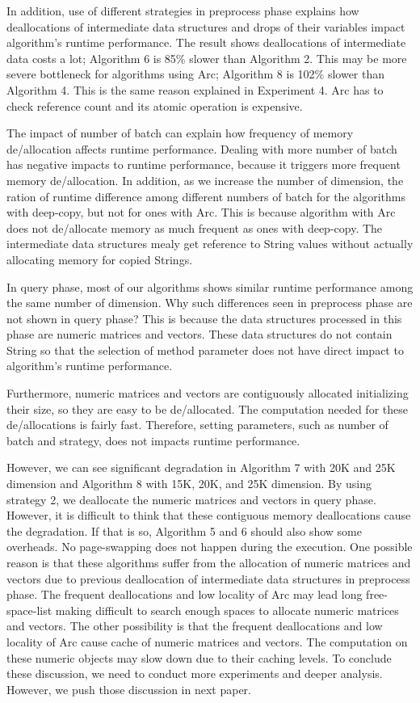 In addition, use of different strategies in preprocess phase explains how deallocations of intermediate data structures and drops of their variables impact algorithm's runtime performance.
The result shows deallocations of intermediate data costs a lot; Algorithm 6 is 85\% slower than Algorithm 2.
This may be more severe bottleneck for algorithms using Arc; Algorithm 8 is 102\% slower than Algorithm 4.
This is the same reason explained in Experiment 4. 
Arc has to check reference count and its atomic operation is expensive. 

The impact of number of batch can explain how frequency of memory de/allocation affects runtime performance. 
Dealing with more number of batch has negative impacts to runtime performance, because it triggers more frequent memory de/allocation.
In addition, as we increase the number of dimension, the ration of runtime difference among different numbers of batch for the algorithms with deep-copy, but not for ones with Arc.
This is because algorithm with Arc does not de/allocate memory as much frequent as ones with deep-copy.
The intermediate data structures mealy get reference to String values without actually allocating memory for copied Strings.

In query phase, most of our algorithms shows similar runtime performance among the same number of dimension. 
Why such differences seen in preprocess phase are not shown in query phase? This is because the data structures processed in this phase are numeric matrices and vectors. 
These data structures do not contain String so that the selection of method parameter does not have direct impact to algorithm's runtime performance.

Furthermore, numeric matrices and vectors are contiguously allocated initializing their size, so they are easy to be de/allocated. 
The computation needed for these de/allocations is fairly fast. Therefore, setting parameters, such as number of batch and strategy, does not impacts runtime performance.

However, we can see significant degradation in Algorithm 7 with 20K and 25K dimension and Algorithm 8 with 15K, 20K, and 25K dimension. 
By using strategy 2, we deallocate the numeric matrices and vectors in query phase. However, it is difficult to think that these contiguous memory deallocations cause the degradation. 
If that is so, Algorithm 5 and 6 should also show some overheads. No page-swapping does not happen during the execution. 
One possible reason is that these algorithms suffer from the allocation of numeric matrices and vectors due to previous deallocation of intermediate data structures in preprocess phase. 
The frequent deallocations and low locality of Arc may lead long free-space-list making difficult to search enough spaces to allocate numeric matrices and vectors.
The other possibility is that the frequent deallocations and low locality of Arc cause cache of numeric matrices and vectors. 
The computation on these numeric objects may slow down due to their caching levels. 
To conclude these discussion, we need to conduct more experiments and deeper analysis. 
However, we push those discussion in next paper.

